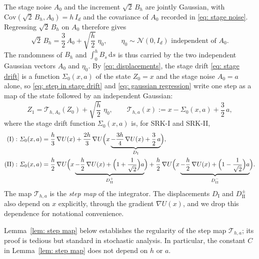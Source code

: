 \documentclass[namedate,webpdf,imanum]{ima-authoring-template}
\newcommand{\D}{\mathrm{d}}
\theoremstyle{thmstyletwo}
\numberwithin{equation}{section}
\begin{document}
The stage noise $A_0$ and the increment $\sqrt2\, B_h$ are jointly Gaussian, with $\mathrm{Cov}(\sqrt2\, B_h, A_0) = h\, I_d$ and the covariance of $A_0$ recorded in \eqref{eq: stage noise}. Regressing $\sqrt2\, B_h$ on $A_0$ therefore gives
\begin{equation}
    \sqrt2\, B_h = \frac32\, A_0 + \sqrt{\frac h2}\; \eta_0 , \qquad \eta_0 \sim \mathcal N(0, I_d) \text{ independent of } A_0 .
    \label{eq: gaussian regression}
\end{equation}
The randomness of $B_h$ and $\int_0^h B_s\,\D s$ is thus carried by the two independent Gaussian vectors $A_0$ and $\eta_0$. By \eqref{eq: displacements}, the stage drift \eqref{eq: stage drift} is a function $\Sigma_0(x, a)$ of the state $Z_0 = x$ and the stage noise $A_0 = a$ alone, so \eqref{eq: step in stage drift} and \eqref{eq: gaussian regression} write one step as a map of the state followed by an independent Gaussian:
\begin{equation}
    Z_1 = \mathcal T_{h, A_0}(Z_0) + \sqrt{\frac h2}\; \eta_0 , \qquad
    \mathcal T_{h,a}(x) := x - \Sigma_0(x, a) + \frac32\, a ,
    \label{eq: step map}
\end{equation}
where the stage drift function $\Sigma_0(x, a)$ is, for SRK-I and SRK-II,
\begin{equation}
\begin{aligned}
    \mathrm{(I):~} \Sigma_0(x, a) & = \frac h3\, \nabla U(x) + \frac{2h}{3}\, \nabla U\Bigl( x \underbrace{- \frac{3h}{4}\, \nabla U(x) + \frac32\, a}_{D_{\mathrm I}} \Bigr) , \\
    \mathrm{(II):~} \Sigma_0(x, a) & = \frac h2\, \nabla U\Bigl( x \underbrace{- \frac h2\, \nabla U(x) + \Bigl( 1 + \frac{1}{\sqrt2} \Bigr) a}_{D_{\mathrm{II}}^{+}} \Bigr)
    + \frac h2\, \nabla U\Bigl( x \underbrace{- \frac h2\, \nabla U(x) + \Bigl( 1 - \frac{1}{\sqrt2} \Bigr) a}_{D_{\mathrm{II}}^{-}} \Bigr) .
\end{aligned}
\label{eq: stage drift explicit}
\end{equation}
The map $\mathcal T_{h,a}$ is the \emph{step map} of the integrator. The displacements $D_{\mathrm I}$ and $D_{\mathrm{II}}^{\pm}$ also depend on $x$ explicitly, through the gradient $\nabla U(x)$, and we drop this dependence for notational convenience.

Lemma~\ref{lem: step map} below establishes the regularity of the step map $\mathcal T_{h,a}$; its proof is tedious but standard in stochastic analysis. In particular, the constant $C$ in Lemma~\ref{lem: step map} does not depend on $h$ or $a$.
\end{document}

